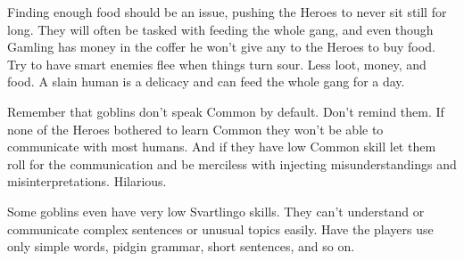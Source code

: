 Finding enough food should be an issue, pushing the Heroes to never sit still for long. They will often be tasked with feeding the whole gang, and even though Gamling has money in the coffer he won't give any to the Heroes to buy food. Try to have smart enemies flee when things turn sour. Less loot, money, and food. A slain human is a delicacy and can feed the whole gang for a day.

Remember that goblins don't speak Common by default. Don't remind them. If none of the Heroes bothered to learn Common they won't be able to communicate with most humans. And if they have low Common skill let them roll for the communication and be merciless with injecting misunderstandings and misinterpretations. Hilarious. 

 \label{misunderstandings}
Some goblins even have very low Svartlingo skills. They can't understand or communicate complex sentences or unusual topics easily. Have the players use only simple words, pidgin grammar, short sentences, and so on.

